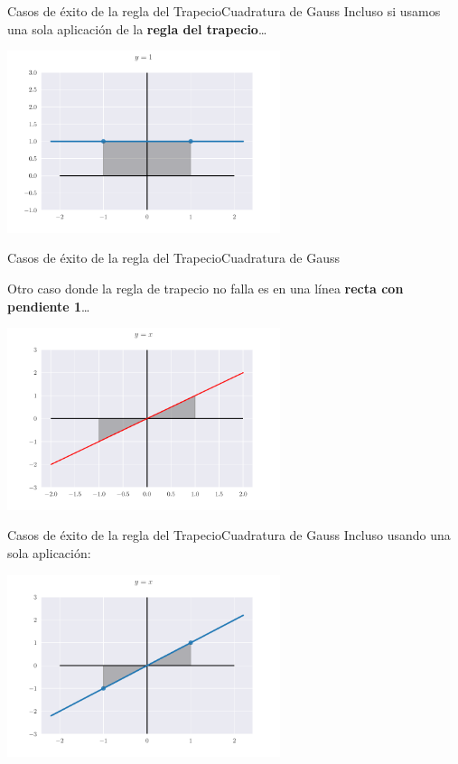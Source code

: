 \documentclass[spanish, c, dvipsnames]{beamer}
\begin{document}
\begin{frame}{Casos de éxito de la regla del Trapecio}{Cuadratura de Gauss}
    Incluso si usamos una sola aplicación de la \textbf{regla del trapecio}\dots

    \begin{center}
        \includegraphics[width=0.6\textwidth]{constanttrapezoidal.pdf}
    \end{center}
\end{frame}

\begin{frame}{Casos de éxito de la regla del Trapecio}{Cuadratura de Gauss}

    Otro caso donde la regla de trapecio no falla es en una línea \textbf{recta con pendiente 1}\dots

    \begin{center}
        \includegraphics[width=0.6\textwidth]{yequalsx.pdf}
    \end{center}

\end{frame}

\begin{frame}{Casos de éxito de la regla del Trapecio}{Cuadratura de Gauss}
    Incluso usando una sola aplicación:

    \begin{center}
        \includegraphics[width=0.6\textwidth]{yequalsxtrapezoidal.pdf}
    \end{center}

\end{frame}
\end{document}

